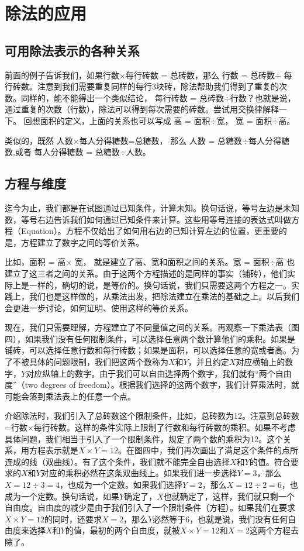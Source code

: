 \section{除法的应用}
\subsection{可用除法表示的各种关系}

前面的例子告诉我们，如果行数$\times$每行砖数 = 总砖数，那么
行数 = 总砖数$\div$ 每行砖数。注意到我们需要重复同样的每行3块砖，除法帮助我们得到了重复的次数。同样的，能不能得出一个类似结论， 每行砖数 = 总砖数$\div$行数？也就是说，通过重复的次数（行数），除法可以得到每次需要的砖数。尝试用交换律解释一下。 回想面积的定义，上面的关系也可以写成 高 = 面积$\div$宽， 宽 = 面积$\div$高。

类似的，既然
人数$\times$每人分得糖数=总糖数，
那么 
人数 = 总糖数$\div$每人分得糖数,或者 每人分得糖数 = 总糖数$\div$人数。

\subsection{方程与维度}

迄今为止，我们都是在试图通过已知条件，计算未知。换句话说，等号左边是未知数，等号右边告诉我们如何通过已知条件来计算。这些用等号连接的表达式叫做方程（Equation）。方程不仅给出了如何用右边的已知计算左边的位置，更重要的是，方程建立了数字之间的等价关系。

比如，面积 = 高$\times$ 宽， 就是建立了高、宽和面积之间的关系。宽 = 面积$\div$高 也建立了这三者之间的关系。由于这两个方程描述的是同样的事实（铺砖），他们实际上是一样的，确切的说，是等价的。换句话说，我们只需要这两个方程之一。实践上，我们也是这样做的，从乘法出发，把除法建立在乘法的基础之上。以后我们会更进一步讨论，如何证明、使用这样的等价关系。

现在，我们只需要理解，方程建立了不同量值之间的关系。再观察一下乘法表（图四），如果我们没有任何限制条件，可以选择任意两个数计算他们的乘积。如果是铺砖，可以选择任意行数和每行砖数；如果是面积，可以选择任意的宽或者高。为了不被具体的问题限制，我们把这两个数称为$X$和$Y$，并且约定$X$对应横轴上的数字，$Y$对应纵轴上的数字。由于我们可以自由选择两个数字，我们就有“两个自由度”（two degrees of freedom）。根据我们选择的这两个数字，我们计算乘法时，就可能会落到乘法表上的任意一个点。

介绍除法时，我们引入了总砖数这个限制条件，比如，总砖数为12。注意到总砖数=行数$\times$每行砖数。这样的条件实际上限制了行数和每行砖数的乘积。如果不考虑具体问题，我们相当于引入了一个限制条件，规定了两个数的乘积为12。这个关系，用方程表示就是$X\times Y = 12$。在图四中，我们再次画出了满足这个条件的点所连成的线（双曲线）。有了这个条件，我们就不能完全自由选择$X$和$Y$的值。符合要求的$X$和$Y$对应的乘积必然在这条双曲线上。如果我们进一步选择$Y=3$，那么$X=12\div3=4$，也成为一个定数。如果我们选择$Y=2$，那么$X=12\div2=6$，也成为一个定数。换句话说，如果$Y$确定了，$X$也就确定了，这样，我们就只剩一个自由度。自由度的减少是由于我们引入了一个限制条件（方程）。如果我们在要求$X\times Y = 12$的同时，还要求$X=2$，那么$Y$必然等于6，也就是说，我们没有任何自由度来选择$X$和$Y$的值，最初的两个自由度，就被$X\times Y = 12$和$X=2$这两个方程去除了。

